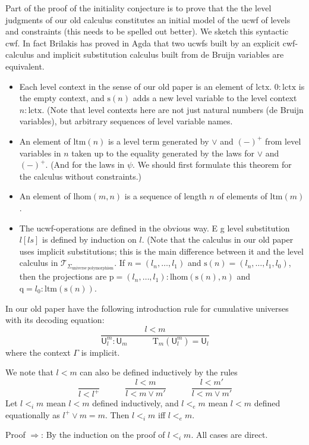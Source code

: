 \documentclass[11pt,a4paper]{article}
\theoremstyle{definition}
\newcommand{\UU}{\mathsf{U}}
\def\lhom{\mathrm{lhom}}
\def\UU{\mathsf{U}}
\newcommand{\T}{\mathsf{T}}
\def\lctx{\mathrm{lctx}}
\def\ltm{\mathrm{ltm}}
\def\s{\mathrm{s}}
\def\p{\mathrm{p}}
\def\q{\mathrm{q}}
\def\T{\mathcal{T}}
\newcommand{\Ta}{\mathrm{T}}
\begin{document}
Part of the proof of the initiality conjecture is to prove that the the level judgments of our old calculus constitutes an initial model of the ucwf of levels and constraints (this needs to be spelled out better). We sketch this syntactic cwf. In fact Brilakis has proved in Agda that two ucwfs built by an explicit cwf-calculus and implicit substitution calculus built from de Bruijn variables are equivalent. 
\begin{itemize}
\item Each level context in the sense of our old paper is an element of $\lctx$. $0 : \lctx$ is the empty context, and $\s(n)$ adds a new level variable to the level context $n : \lctx$. (Note that level contexts here are not just natural numbers (de Bruijn variables), but arbitrary sequences of level variable names.
\item An element of $\ltm(n)$ is a level term generated by $\vee$ and $(-)^+$ from level variables in $n$ taken up to the equality generated by the laws for
$\vee$ and $(-)^+$. (And for the laws in $\psi$. We should first formulate this theorem for the calculus without constraints.)
 \item An element of $\lhom(m,n)$ is a sequence of length $n$ of elements of $\ltm(m)$.
 \item The ucwf-operations are defined in the obvious way. E g level substitution $l[ls]$ is defined by induction on $l$. (Note that the calculus in our old paper uses implicit substitutions; this is the main difference between it and the level calculus in $\T_{\Sigma_{\mathrm{universe\ polymorphism}}}$. If $n = (l_n, \ldots, l_1)$ and $\s(n) =  (l_n, \ldots, l_1, l_0)$, then the projections are  $\p = (l_n, \ldots, l_1) : \lhom(\s(n),n)$ and $\q = l_0 : \ltm(\s(n))$.
\end{itemize}
In our old paper have the following introduction rule for cumulative universes with its decoding equation:
$$
\frac{l < m}
{\UU^m_l : \UU_m\hspace{3em}\Ta_m(\UU^m_l) = \UU_l}
$$
where the context $\Gamma$ is implicit.

We note that $l < m$ can also be defined inductively by the rules
$$
\frac{}{l < l^+}
\hspace{3em}
\frac{l < m}{l < m \vee m'}
\hspace{3em}
\frac{l < m'}{l < m \vee m'}
$$
Let $l <_i m$ mean $l < m$ defined inductively, and  $l <_e m$ mean $l < m$ defined equationally as $l^+ \vee m = m$. Then $l <_i m$ iff $l <_e m$.

Proof $\Rightarrow$: By the induction on the proof of $l <_i m$. All cases are direct.
\end{document}

